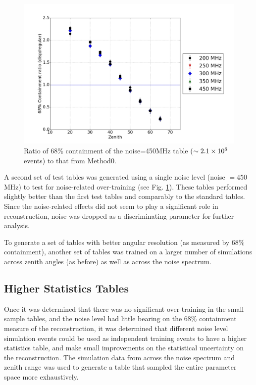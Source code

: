 \documentclass[main.tex]{subfiles}
\begin{document}
\begin{figure}[htbp]
  \centering
  \includegraphics[width=0.8\linewidth]{images/disp_450_ratio_xzen}
  \caption[\disp table reconstruction vs noise.]{Ratio of 68\% containment of the noise=450MHz \disp table ($\sim 2.1\times 10^{6}$ events) to that from Method0.}
  \label{fig:disp_ratio_450}
\end{figure}

A second set of test \disp tables was generated using a single noise level (noise $= 450$ MHz) to test for noise-related over-training (see Fig. \ref{fig:disp_ratio_450}). These tables performed slightly better than the first test tables and comparably to the standard \disp tables. Since the noise-related effects did not seem to play a significant role in reconstruction, noise was dropped as a discriminating parameter for further analysis.

To generate a set of \disp tables with better angular resolution (as measured by 68\% containment), another set of \disp tables was trained on a larger number of simulations across zenith angles (as before) as well as across the noise spectrum.

\subsection{Higher Statistics Tables}
Once it was determined that there was no significant over-training in the small sample \disp tables, and the noise level had little bearing on the 68\% containment measure of the reconstruction, it was determined that different noise level simulation events could be used as independent training events to have a higher statistics \disp table, and make small improvements on the statistical uncertainty on the reconstruction. The simulation data from across the noise spectrum and zenith range was used to generate a \disp table that sampled the entire parameter space more exhaustively.
\end{document}
